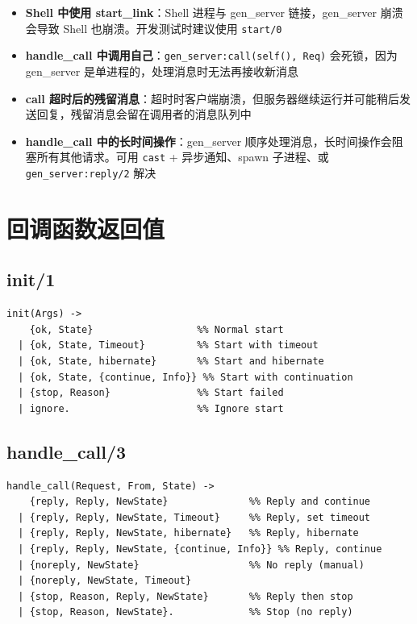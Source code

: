 \documentclass[a4paper,11pt]{article}
\begin{document}
\begin{itemize}[leftmargin=2em]
    \item \textbf{Shell 中使用 start\_link}：Shell 进程与 gen\_server 链接，gen\_server 崩溃会导致 Shell 也崩溃。开发测试时建议使用 \texttt{start/0}
    \item \textbf{handle\_call 中调用自己}：\texttt{gen\_server:call(self(), Req)} 会死锁，因为 gen\_server 是单进程的，处理消息时无法再接收新消息
    \item \textbf{call 超时后的残留消息}：超时时客户端崩溃，但服务器继续运行并可能稍后发送回复，残留消息会留在调用者的消息队列中
    \item \textbf{handle\_call 中的长时间操作}：gen\_server 顺序处理消息，长时间操作会阻塞所有其他请求。可用 \texttt{cast} + 异步通知、spawn 子进程、或 \texttt{gen\_server:reply/2} 解决
\end{itemize}


\section{回调函数返回值}

\subsection{init/1}

\begin{lstlisting}[style=erlangstyle]
init(Args) ->
    {ok, State}                  %% Normal start
  | {ok, State, Timeout}         %% Start with timeout
  | {ok, State, hibernate}       %% Start and hibernate
  | {ok, State, {continue, Info}} %% Start with continuation
  | {stop, Reason}               %% Start failed
  | ignore.                      %% Ignore start
\end{lstlisting}

\subsection{handle\_call/3}

\begin{lstlisting}[style=erlangstyle]
handle_call(Request, From, State) ->
    {reply, Reply, NewState}              %% Reply and continue
  | {reply, Reply, NewState, Timeout}     %% Reply, set timeout
  | {reply, Reply, NewState, hibernate}   %% Reply, hibernate
  | {reply, Reply, NewState, {continue, Info}} %% Reply, continue
  | {noreply, NewState}                   %% No reply (manual)
  | {noreply, NewState, Timeout}
  | {stop, Reason, Reply, NewState}       %% Reply then stop
  | {stop, Reason, NewState}.             %% Stop (no reply)
\end{lstlisting}
\end{document}
